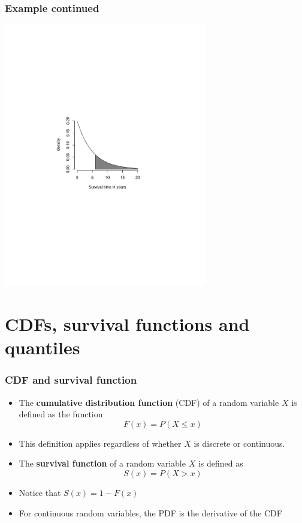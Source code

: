 \documentclass[aspectratio=169]{beamer}
\begin{document}
\begin{frame}
\frametitle{Example continued}
   \includegraphics[width=3.5in]{exponential.pdf}
\end{frame}

\section{CDFs, survival functions and quantiles}
\begin{frame}
\frametitle{CDF and survival function}
\begin{itemize}
\item The {\bf cumulative distribution function} (CDF) of a random variable $X$
is defined as the function 
$$
F(x) = P(X \leq x)
$$
\item This definition applies regardless of whether $X$ is discrete or continuous.
\item The {\bf survival function} of a random variable $X$ is defined as
$$
S(x) = P(X > x)
$$
\item Notice that $S(x) = 1 - F(x)$
\item For continuous random variables, the PDF is the derivative of the CDF
\end{itemize}
\end{frame}
\end{document}
